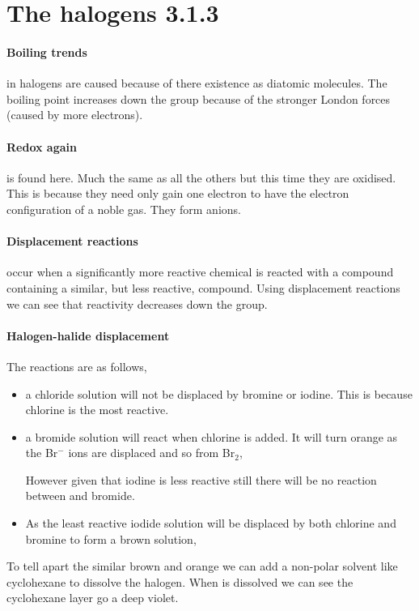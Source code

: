 \documentclass[11pt,a4paper]{memoir}
\begin{document}
\section{The halogens 3.1.3}
	
	\paragraph{Boiling trends} in halogens are caused because of there existence as diatomic molecules. The boiling point increases down the group because of the stronger London forces (caused by more electrons).
	
	\paragraph{Redox again} is found here. Much the same as all the others but this time they are oxidised. This is because they need only gain one electron to have the electron configuration of a noble gas. They form anions.
	
	\paragraph{Displacement reactions} occur when a significantly more reactive chemical is reacted with a compound containing a similar, but less reactive, compound. Using displacement reactions we can see that reactivity decreases down the group.
	
	\paragraph{Halogen-halide displacement} The reactions are as follows,
	\begin{itemize}
		\item a chloride solution will not be displaced by bromine or iodine. This is because chlorine is the most reactive.
		\item a bromide solution will react when chlorine is added. It will turn orange as the Br$^-$ ions are displaced and so from Br$_2$,
		
			However given that iodine is less reactive still there will be no reaction between  and bromide.
		\item As the least reactive iodide solution will be displaced by both chlorine and bromine to form a brown solution,
		
			
	\end{itemize}
	To tell apart the similar brown and orange we can add a non-polar solvent like cyclohexane to dissolve the halogen. When  is dissolved we can see the cyclohexane layer go a deep violet.
	
\end{document}
